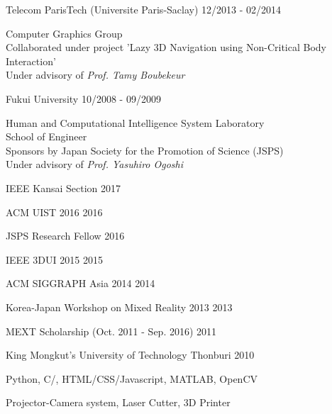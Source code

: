 \documentclass[11pt]{article} %
\begin{document}
\begin{description}
	\squish
	{Telecom ParisTech (Universite Paris-Saclay)}
	{12/2013 - 02/2014}
	
	Computer Graphics Group\\
	Collaborated under project 'Lazy 3D Navigation using Non-Critical Body Interaction'\\
	Under advisory of \textit{Prof. Tamy Boubekeur}
	
	{Fukui University}
	{10/2008 - 09/2009}
	
	Human and Computational Intelligence System Laboratory\\
	School of Engineer\\
	Sponsors by Japan Society for the Promotion of Science (JSPS)\\
	Under advisory of \textit{Prof. Yasuhiro Ogoshi}
	
\end{description}


\begin{description}
	\squish
	{IEEE Kansai Section}
	{2017}
	
	{ACM UIST 2016}
	{2016}
	
	{JSPS Research Fellow}
	{2016}
	
	{IEEE 3DUI 2015}
	{2015}
	
	{ACM SIGGRAPH Asia 2014}
	{2014}
	
	{Korea-Japan Workshop on Mixed Reality 2013}
	{2013}
	
	{MEXT Scholarship (Oct. 2011 - Sep. 2016)}
	{2011}
	
	{King Mongkut's University of Technology Thonburi}
	{2010}
	
	\bigskip
	
\end{description}


{Python, C/\CPP, HTML/CSS/Javascript, MATLAB, OpenCV}

{Projector-Camera system, Laser Cutter, 3D Printer}
\end{document}
